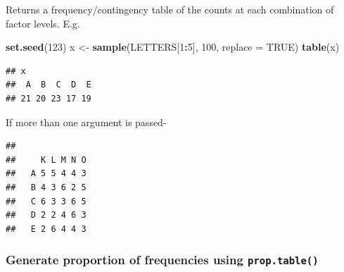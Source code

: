 \documentclass[
]{book}
\newenvironment{Shaded}{\begin{snugshade}}{\end{snugshade}}
\newcommand{\AttributeTok}[1]{\textcolor[rgb]{0.13,0.29,0.53}{#1}}
\newcommand{\ConstantTok}[1]{\textcolor[rgb]{0.56,0.35,0.01}{#1}}
\newcommand{\DecValTok}[1]{\textcolor[rgb]{0.00,0.00,0.81}{#1}}
\newcommand{\FunctionTok}[1]{\textcolor[rgb]{0.13,0.29,0.53}{\textbf{#1}}}
\newcommand{\NormalTok}[1]{#1}
\newcommand{\OtherTok}[1]{\textcolor[rgb]{0.56,0.35,0.01}{#1}}
\newcommand{\SpecialCharTok}[1]{\textcolor[rgb]{0.81,0.36,0.00}{\textbf{#1}}}
\begin{document}
Returns a frequency/contingency table of the counts at each combination of factor levels. E.g.

\begin{Shaded}
\begin{Highlighting}[]
\FunctionTok{set.seed}\NormalTok{(}\DecValTok{123}\NormalTok{)}
\NormalTok{x }\OtherTok{\textless{}{-}} \FunctionTok{sample}\NormalTok{(LETTERS[}\DecValTok{1}\SpecialCharTok{:}\DecValTok{5}\NormalTok{], }\DecValTok{100}\NormalTok{, }\AttributeTok{replace =} \ConstantTok{TRUE}\NormalTok{)}
\FunctionTok{table}\NormalTok{(x)}
\end{Highlighting}
\end{Shaded}

\begin{verbatim}
## x
##  A  B  C  D  E 
## 21 20 23 17 19
\end{verbatim}

If more than one argument is passed-

\begin{Shaded}
\end{Shaded}

\begin{verbatim}
##    
##     K L M N O
##   A 5 5 4 4 3
##   B 4 3 6 2 5
##   C 6 3 3 6 5
##   D 2 2 4 6 3
##   E 2 6 4 4 3
\end{verbatim}

\hypertarget{generate-proportion-of-frequencies-using-prop.table}{%
\subsubsection*{\texorpdfstring{Generate proportion of frequencies using \texttt{prop.table()}}{Generate proportion of frequencies using prop.table()}}\label{generate-proportion-of-frequencies-using-prop.table}}
\end{document}
